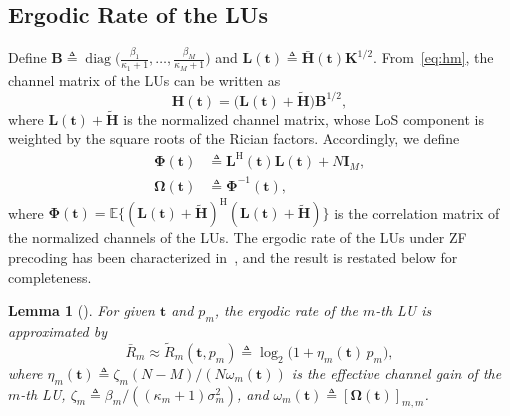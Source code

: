 \documentclass[journal]{IEEEtran}
\newtheorem{lemma}{Lemma}
\newcommand{\E}{\mathbb{E}}
\newcommand{\diag}{\operatorname{diag}}
\newcommand{\bt}{\mathbf{t}}
\newcommand{\bH}{\mathbf{H}}
\newcommand{\Hb}{\bar{\mathbf{H}}}
\newcommand{\Htl}{\tilde{\mathbf{H}}}
\newcommand{\bK}{\mathbf{K}}
\newcommand{\bB}{\mathbf{B}}
\newcommand{\bL}{\mathbf{L}}
\newcommand{\bI}{\mathbf{I}}
\newcommand{\bOm}{\boldsymbol{\Omega}}
\newcommand{\bPhi}{\boldsymbol{\Phi}}
\begin{document}
\subsection{Ergodic Rate of the LUs}\label{sec:lu}

Define $\bB\triangleq\diag\big(\frac{\beta_1}{\kappa_1+1},\ldots,\frac{\beta_M}{\kappa_M+1}\big)$ and $\bL(\bt)\triangleq\Hb(\bt)\bK^{1/2}$. From~\eqref{eq:hm}, the channel matrix of the LUs can be written as
\begin{equation}\label{eq:Hdecomp}
\bH(\bt)=\big(\bL(\bt)+\Htl\big)\bB^{1/2},
\end{equation}
where $\bL(\bt)+\Htl$ is the normalized channel matrix, whose LoS component is weighted by the square roots of the Rician factors. Accordingly, we define
\begin{equation}\label{eq:Phi}
\begin{aligned}
\bPhi(\bt)&\triangleq\bL^{\mathrm{H}}(\bt)\bL(\bt)+N\bI_M,\\
\bOm(\bt)&\triangleq\bPhi^{-1}(\bt),
\end{aligned}
\end{equation}
where $\bPhi(\bt)=\E\{(\bL(\bt)+\Htl)^{\mathrm{H}}(\bL(\bt)+\Htl)\}$ is the correlation matrix of the normalized channels of the LUs. The ergodic rate of the LUs under ZF precoding has been characterized in~\cite{ZhangJSTSP2014,ZhengTCOM2025}, and the result is restated below for completeness.

\begin{lemma}[{\cite{ZhangJSTSP2014,ZhengTCOM2025}}]\label{lem:lu}
For given $\bt$ and $p_m$, the ergodic rate of the $m$-th LU is approximated by
\begin{equation}\label{eq:Rm}
\bar R_m\approx\tilde R_m(\bt,p_m)\triangleq\log_2\big(1+\eta_m(\bt)\,p_m\big),
\end{equation}
where $\eta_m(\bt)\triangleq\zeta_m(N-M)/(N\omega_m(\bt))$ is the effective channel gain of the $m$-th LU, $\zeta_m\triangleq\beta_m/((\kappa_m+1)\sigma_m^2)$, and $\omega_m(\bt)\triangleq[\bOm(\bt)]_{m,m}$.
\end{lemma}
\end{document}
